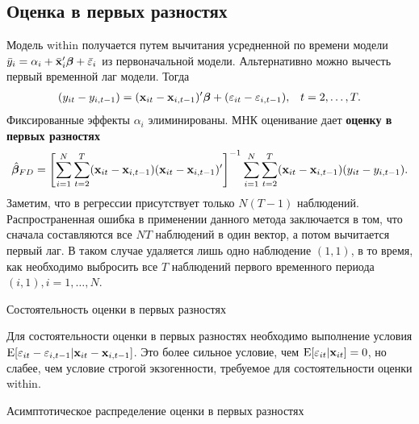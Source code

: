 \subsection{Оценка в первых разностях}

Модель within получается путем вычитания усредненной по времени модели $\bar{y}_i=\alpha_i+\bar{\mathbf{x}}'_i\bm\beta +\bar{\varepsilon}_i$ из первоначальной модели. Альтернативно можно вычесть первый временной лаг модели. Тогда
\begin{align}
&(y_{it}-y_{i,t-1})=(\mathbf{x}_{it}-\mathbf{x}_{i,t-1})'\bm\beta+(\varepsilon_{it}-\varepsilon_{i,t-1}), &t=2, \dots, T.
\label{Eq:21.34}
\end{align}
Фиксированные эффекты $\alpha_i$ элиминированы. МНК оценивание дает \textbf{оценку в первых разностях}
\begin{align}
\hat{\bm\beta}_{FD}=\left[\sum^N_{i=1}\sum^T_{t=2}(\mathbf{x}_{it}-\mathbf{x}_{i,t-1})(\mathbf{x}_{it}-\mathbf{x}_{i,t-1})'\right]^{-1}
\sum^N_{i=1}\sum^T_{t=2}(\mathbf{x}_{it}-\mathbf{x}_{i,t-1})(y_{it}-y_{i,t-1}).
\label{Eq:21.35}
\end{align}
Заметим, что в регрессии присутствует только $N(T-1)$ наблюдений. Распространенная ошибка в применении данного метода заключается в том, что сначала составляются все $NT$ наблюдений в один вектор, а потом вычитается первый лаг. В таком случае удаляется лишь одно наблюдение $(1, 1)$, в то время, как необходимо выбросить все $T$ наблюдений  первого временного периода $(i, 1), i=1, \dots, N$.

 {\centering
Состоятельность оценки в первых разностях\\}

Для состоятельности оценки в первых разностях необходимо выполнение условия $\mathrm E[\varepsilon_{it}-\varepsilon_{i,t-1}| \mathbf{x}_{it}-\mathbf{x}_{i, t-1}]$. Это более сильное условие, чем  $\mathrm E[\varepsilon_{it}|\mathbf{x}_{it}]=0$, но слабее, чем условие строгой экзогенности, требуемое для состоятельности оценки within.


 {\centering
Асимптотическое распределение оценки в первых разностях\\}

